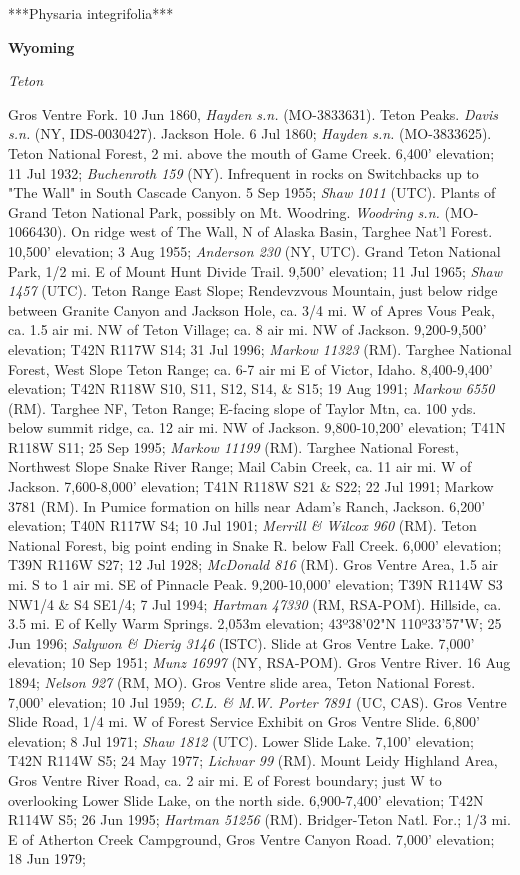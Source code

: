 ***Physaria integrifolia***

\textbf{Wyoming} 

\textit{Teton}

Gros Ventre Fork. 10 Jun 1860, 	\textit{Hayden s.n.} (MO-3833631).  Teton Peaks. \textit{Davis s.n.} (NY, IDS-0030427).  Jackson Hole. 6 Jul 1860; \textit{Hayden s.n.} (MO-3833625).  Teton National Forest, 2 mi. above the mouth of Game Creek. 6,400' elevation; 11 Jul 1932; \textit{Buchenroth 159} (NY).  Infrequent in rocks on Switchbacks up to "The Wall" in South Cascade Canyon. 5 Sep 1955; \textit{Shaw 1011} (UTC).  Plants of Grand Teton National Park, possibly on Mt. Woodring. \textit{Woodring s.n.} (MO-1066430).  On ridge west of The Wall, N of Alaska Basin, Targhee Nat'l Forest. 10,500' elevation; 3 Aug 1955; \textit{Anderson 230} (NY, UTC).  Grand Teton National Park, 1/2 mi. E of Mount Hunt Divide Trail. 9,500' elevation; 11 Jul 1965; \textit{Shaw 1457} (UTC).  Teton Range East Slope; Rendevzvous Mountain, just below ridge between Granite Canyon and Jackson Hole, ca. 3/4 mi. W of Apres Vous Peak, ca. 1.5 air mi. NW of Teton Village; ca. 8 air mi. NW of Jackson. 9,200-9,500' elevation; T42N R117W S14; 31 Jul 1996; \textit{Markow 11323} (RM).  Targhee National Forest, West Slope Teton Range; ca. 6-7 air mi E of Victor, Idaho.  8,400-9,400' elevation; T42N R118W S10, S11, S12, S14, \& S15; 19 Aug 1991; \textit{Markow 6550} (RM).  Targhee NF, Teton Range; E-facing slope of Taylor Mtn, ca. 100 yds. below summit ridge, ca. 12 air mi. NW of Jackson.  9,800-10,200' elevation; T41N R118W S11; 25 Sep 1995; \textit{Markow 11199} (RM).  Targhee National Forest, Northwest Slope Snake River Range; Mail Cabin Creek, ca. 11 air mi. W of Jackson.  7,600-8,000’ elevation; T41N R118W S21 \& S22; 22 Jul 1991; Markow 3781 (RM).  In Pumice formation on hills near Adam's Ranch, Jackson. 6,200' elevation; T40N R117W S4; 10 Jul 1901; \textit{Merrill \& Wilcox 960} (RM).  Teton National Forest, big point ending in Snake R. below Fall Creek. 6,000' elevation; T39N R116W S27; 12 Jul 1928; \textit{McDonald 816} (RM).  Gros Ventre Area, 1.5 air mi. S to 1 air mi. SE of Pinnacle Peak.  9,200-10,000' elevation; T39N R114W S3 NW1/4 \& S4 SE1/4; 7 Jul 1994; \textit{Hartman 47330} (RM, RSA-POM).  Hillside, ca. 3.5 mi. E of Kelly Warm Springs. 2,053m elevation; 43º38'02"N 110º33'57"W; 25 Jun 1996; \textit{Salywon \& Dierig 3146} (ISTC).  Slide at Gros Ventre Lake. 7,000' elevation; 10 Sep 1951; \textit{Munz 16997} (NY, RSA-POM).  Gros Ventre River. 16 Aug 1894; \textit{Nelson 927} (RM, MO).  Gros Ventre slide area, Teton National Forest. 7,000' elevation; 10 Jul 1959; \textit{C.L. \& M.W. Porter 7891} (UC, CAS).  Gros Ventre Slide Road, 1/4 mi. W of Forest Service Exhibit on Gros Ventre Slide. 6,800' elevation; 8 Jul 1971; \textit{Shaw 1812} (UTC).  Lower Slide Lake. 7,100' elevation; T42N R114W S5; 24 May 1977; \textit{Lichvar 99} (RM).  Mount Leidy Highland Area, Gros Ventre River Road, ca. 2 air mi. E of Forest boundary; just W to overlooking Lower Slide Lake, on the north side.  6,900-7,400' elevation; T42N R114W S5; 26 Jun 1995; \textit{Hartman 51256} (RM).  Bridger-Teton Natl. For.; 1/3 mi. E of Atherton Creek Campground, Gros Ventre Canyon Road. 7,000' elevation; 18 Jun 1979; 